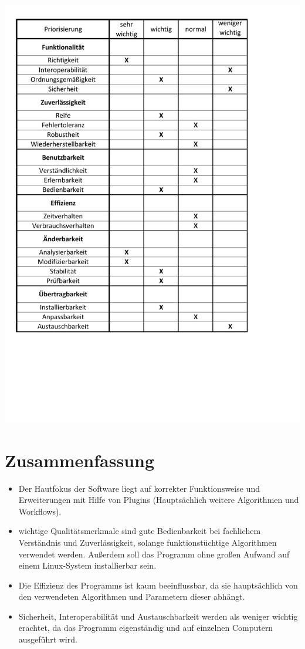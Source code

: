 \begin{normalsize}

\end{normalsize}
\includegraphics[width=1.15\textwidth]{img/Quali.pdf}
\begin{normalsize}

\end{normalsize}

\section{Zusammenfassung}
 
\begin{itemize}
\item Der Hautfokus der Software liegt auf korrekter Funktionsweise und Erweiterungen mit Hilfe von Plugins (Hauptsächlich weitere Algorithmen und Workflows).  
\item wichtige Qualitätsmerkmale sind gute Bedienbarkeit bei fachlichem Verständnis und Zuverlässigkeit, solange funktionstüchtige Algorithmen verwendet werden. Außerdem soll das Programm ohne großen Aufwand auf einem Linux-System installierbar sein.
\item Die Effizienz des Programms ist kaum beeinflussbar, da sie hauptsächlich von den verwendeten Algorithmen und Parametern dieser abhängt.
\item Sicherheit, Interoperabilität und Austauschbarkeit werden als weniger wichtig erachtet, da das Programm eigenständig und auf einzelnen Computern ausgeführt wird.
\end{itemize}